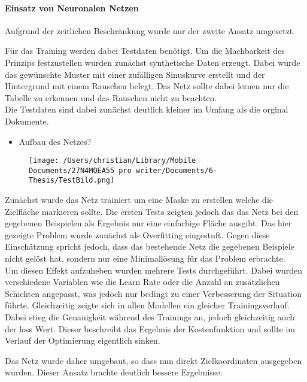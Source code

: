 \documentclass[
]{article}
\begin{document}
\hypertarget{header-n104}{%
\paragraph{Einsatz von Neuronalen Netzen}\label{header-n104}}

Aufgrund der zeitlichen Beschränkung wurde nur der zweite Ansatz
umgesetzt.

Für das Training werden dabei Testdaten benötigt. Um die Machbarkeit des
Prinzips festzustellen wurden zunächst synthetische Daten erzeugt. Dabei
wurde das gewünschte Muster mit einer zufälligen Sinuskurve erstellt und
der Hintergrund mit einem Rauschen belegt. Das Netz sollte dabei lernen
nur die Tabelle zu erkennen und das Rauschen nicht zu beachten. \\
Die Testdaten sind dabei zunächst deutlich kleiner im Umfang als die
orginal Dokumente.

\begin{itemize}
\item
  Aufbau des Netzes?
\end{itemize}

\begin{figure}
\centering
\texttt{[image: /Users/christian/Library/Mobile Documents/27N4MQEA55~pro~writer/Documents/6-Thesis/TestBild.png]}
\caption{}
\end{figure}

Zunächst wurde das Netz trainiert um eine Maske zu erstellen welche die
Zielfläche markieren sollte. Die ersten Tests zeigten jedoch das das
Netz bei den gegebenen Beispielen als Ergebnis nur eine einfarbige
Fläche ausgibt. Das hier gezeigte Problem wurde zunächst als Overfitting
eingestuft. Gegen diese Einschätzung spricht jedoch, dass das bestehende
Netz die gegebenen Beispiele nicht gelöst hat, sondern nur eine
Minimallösung für das Problem erbrachte. \\
Um diesen Effekt aufzuheben wurden mehrere Tests durchgeführt. Dabei
wurden verschiedene Variablen wie die Learn Rate oder die Anzahl an
zusätzlichen Schichten angepasst, was jedoch nur bedingt zu einer
Verbesserung der Situation führte. Gleichzeitig zeigte sich in allen
Modellen ein gleicher Trainingsverlauf. Dabei stieg die Genauigkeit
während des Trainings an, jedoch gleichzeitig auch der loss Wert. Dieser
beschreibt das Ergebnis der Kostenfunktion und sollte im Verlauf der
Optimierung eigentlich sinken.

Das Netz wurde daher umgebaut, so dass nun direkt Zielkoordinaten
ausgegeben wurden. Dieser Ansatz brachte deutlich bessere Ergebnisse:
\end{document}
